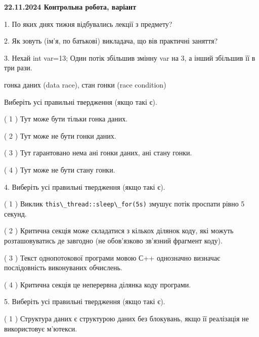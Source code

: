 \documentclass[12pt, ukrainian]{article}
\def\code#1{\Verb!#1!}
\begin{document}
\vspace{4mm}
\newpage
\begin {large}

\textbf{22.11.2024 Контрольна робота, варіант  }\par


{
1. По яких днях тижня відбувались лекції з предмету?



\vspace{5mm}
2. Як зовуть (ім'я, по батькові) викладача, що вів практичні заняття?



\vspace{5mm}
3. Нехай int var=13; Один потік збільшив змінну var на 3, а інший збільшив її в три рази.

гонка даних (data race), стан гонки (race condition)

Виберіть усі правильні твердження (якщо такі є).\par
\vspace{2mm}
( 1 ) Тут може бути тільки гонка даних.%

( 2 ) Тут може не бути гонки даних.%

( 3 ) Тут гарантовано нема ані гонки даних, ані стану гонки.%

( 4 ) Тут може не бути стану гонки.%


\vspace{5mm}
4. Виберіть усі правильні твердження (якщо такі є).\par
\vspace{2mm}

( 1 ) Виклик \code{this\_thread::sleep\_for(5s)} змушує потік проспати рівно 5 секунд.%

( 2 ) Критична секція може складатися з кількох ділянок коду, які можуть розташовуватись де завгодно (не обов’язково зв’язний фрагмент коду).%

( 3 ) Текст однопотокової програми мовою С++ однозначно визначає послідовність виконуваних обчислень.%

( 4 ) Критична секція це неперервна ділянка коду програми.%


\vspace{5mm}
5. Виберіть усі правильні твердження (якщо такі є).\par
\vspace{2mm}

( 1 ) Структура даних є структурою даних без блокувань, якщо її реалізація не використовує м’ютекси.%

}
\end{large}
\end{document}
